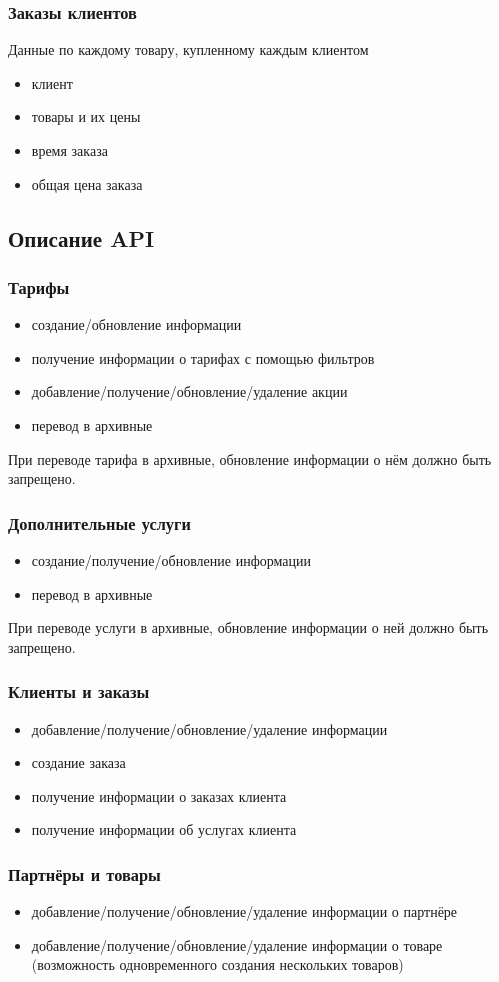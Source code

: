 \subsubsection{Заказы клиентов}
Данные по каждому товару, купленному каждым клиентом
\begin{itemize}
    \item клиент
    \item товары и их цены
    \item время заказа
    \item общая цена заказа
\end{itemize}

\newpage

\subsection{Описание API}

\subsubsection{Тарифы}
\begin{itemize}
    \item создание/обновление информации
    \item получение информации о тарифах с помощью фильтров
    \item добавление/получение/обновление/удаление акции
    \item перевод в архивные
\end{itemize}

При переводе тарифа в архивные, обновление информации о нём должно быть запрещено.

\subsubsection{Дополнительные услуги}
\begin{itemize}
    \item создание/получение/обновление информации
    \item перевод в архивные
\end{itemize}

При переводе услуги в архивные, обновление информации о ней должно быть запрещено.

\subsubsection{Клиенты и заказы}
\begin{itemize}
    \item добавление/получение/обновление/удаление информации
    \item создание заказа
    \item получение информации о заказах клиента
    \item получение информации об услугах клиента
\end{itemize}

\subsubsection{Партнёры и товары}
\begin{itemize}
    \item добавление/получение/обновление/удаление информации о партнёре
    \item добавление/получение/обновление/удаление информации о товаре (возможность одновременного создания нескольких товаров)
\end{itemize}

\newpage
